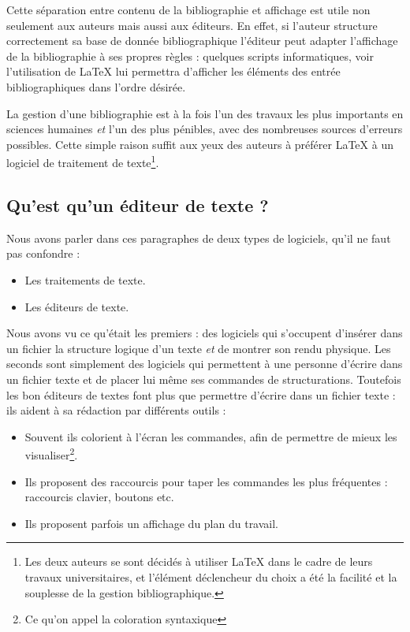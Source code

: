 Cette séparation entre contenu de la bibliographie et affichage est utile non seulement aux auteurs mais aussi aux éditeurs. En effet, si l'auteur structure correctement sa base de donnée bibliographique l'éditeur peut adapter l'affichage de la bibliographie à ses propres règles : quelques scripts informatiques, voir l'utilisation de \LaTeX{} lui permettra d'afficher les éléments des entrée bibliographiques dans l'ordre désirée.

La gestion d'une bibliographie est à la fois l'un des travaux les plus importants en sciences humaines \emph{et} l'un des plus pénibles, avec des nombreuses sources d'erreurs possibles. Cette simple raison suffit aux yeux des auteurs à préférer \LaTeX{} à un logiciel de traitement de texte\footnote{Les deux auteurs se sont décidés à utiliser \LaTeX{} dans le cadre de leurs travaux universitaires, et l'élément déclencheur du choix a été la facilité et la souplesse de la gestion bibliographique.}.

\subsection{Qu'est qu'un éditeur de texte ?}

Nous avons parler dans ces paragraphes de deux types de logiciels, qu'il ne faut pas confondre :
\begin{itemize}
	\item Les traitements de texte.
	\item Les éditeurs de texte.
\end{itemize}

Nous avons vu ce qu'était les premiers : des logiciels qui s'occupent d'insérer dans un fichier la structure logique d'un texte \emph{et} de montrer son rendu physique.
Les seconds sont simplement des logiciels qui permettent à une personne d'écrire dans un fichier texte et de placer lui même ses commandes de structurations.
Toutefois les bon éditeurs de textes font plus que permettre d'écrire dans un fichier texte : ils aident à sa rédaction par différents outils :
\begin{itemize}
\item Souvent ils colorient à l'écran les commandes, afin de permettre de mieux les visualiser\footnote{Ce qu'on appel la coloration syntaxique}.
\item Ils proposent des raccourcis pour taper les commandes les plus fréquentes :  raccourcis clavier, boutons etc.
\item Ils proposent parfois un affichage du plan du travail.
\end{itemize}

